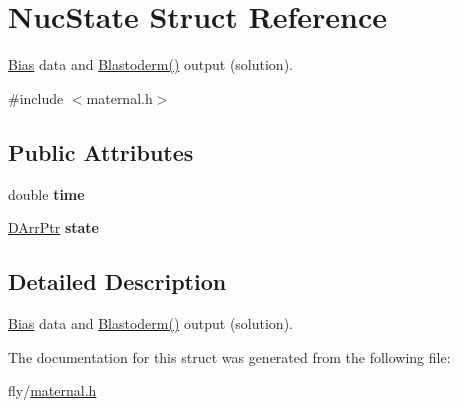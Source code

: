 \hypertarget{structNucState}{
\section{NucState Struct Reference}
\label{structNucState}
}


\hyperlink{structBias}{Bias} data and \hyperlink{integrate_8c_a3677aab63d5dee8dfb44fba8291b5546}{Blastoderm()} output (solution).  


{\ttfamily \#include $<$maternal.h$>$}\subsection*{Public Attributes}
\begin{DoxyCompactItemize}
\item 
\hypertarget{structNucState_a1952098ba6d628487057fd176e7bb2a0}{
double {\bfseries time}}
\label{structNucState_a1952098ba6d628487057fd176e7bb2a0}

\item 
\hypertarget{structNucState_a668f47dffcdc6ac8f100f2bee53dff05}{
\hyperlink{structDArrPtr}{DArrPtr} {\bfseries state}}
\label{structNucState_a668f47dffcdc6ac8f100f2bee53dff05}

\end{DoxyCompactItemize}


\subsection{Detailed Description}
\hyperlink{structBias}{Bias} data and \hyperlink{integrate_8c_a3677aab63d5dee8dfb44fba8291b5546}{Blastoderm()} output (solution). 

The documentation for this struct was generated from the following file:\begin{DoxyCompactItemize}
\item 
fly/\hyperlink{maternal_8h}{maternal.h}\end{DoxyCompactItemize}
